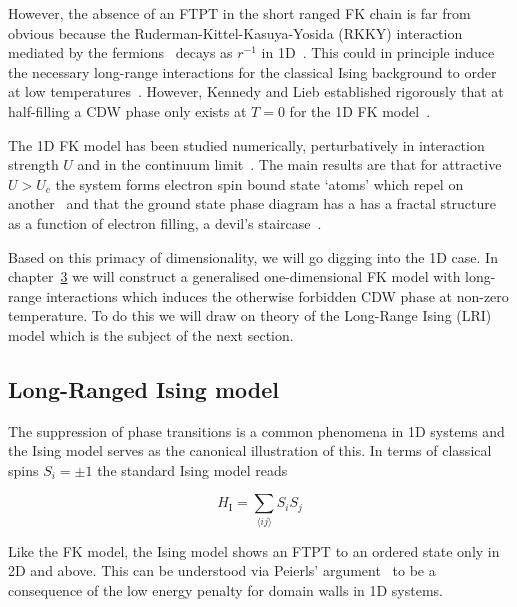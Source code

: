However, the absence of an FTPT in the short ranged FK chain is far from obvious because the Ruderman-Kittel-Kasuya-Yosida (RKKY) interaction mediated by the fermions~\autocite{kasuyaTheoryMetallicFerro1956,rudermanIndirectExchangeCoupling1954,vanvleckNoteInteractionsSpins1962,yosidaMagneticPropertiesCuMn1957} decays as \(r^{-1}\) in 1D~\autocite{rusinCalculationRKKYRange2017}. This could in principle induce the necessary long-range interactions for the classical Ising background to order at low temperatures~\autocite{thoulessLongRangeOrderOneDimensional1969,peierlsIsingModelFerromagnetism1936}. However, Kennedy and Lieb established rigorously that at half-filling a CDW phase only exists at \(T = 0\) for the 1D FK model~\autocite{kennedyItinerantElectronModel1986}.

The 1D FK model has been studied numerically, perturbatively in interaction strength \(U\) and in the continuum limit~\autocite{bursillOneDimensionalContinuum1994}. The main results are that for attractive \(U > U_c\) the system forms electron spin bound state `atoms' which repel on another~\autocite{gruberGroundStateEnergyLowTemperature1993} and that the ground state phase diagram has a has a fractal structure as a function of electron filling, a devil's staircase~\autocite{freericksTwostateOnedimensionalSpinless1990,michelettiCompleteDevilStaircase1997}.

Based on this primacy of dimensionality, we will go digging into the 1D case. In chapter~\protect\hyperlink{chap:3-the-long-range-falicov-kimball-model}{3} we will construct a generalised one-dimensional FK model with long-range interactions which induces the otherwise forbidden CDW phase at non-zero temperature. To do this we will draw on theory of the Long-Range Ising (LRI) model which is the subject of the next section.

\hypertarget{long-ranged-ising-model}{%
\subsection{Long-Ranged Ising model}\label{long-ranged-ising-model}}

The suppression of phase transitions is a common phenomena in 1D systems and the Ising model serves as the canonical illustration of this. In terms of classical spins \(S_i = \pm 1\) the standard Ising model reads

\[H_{\mathrm{I}} = \sum_{\langle ij \rangle} S_i S_j\]

Like the FK model, the Ising model shows an FTPT to an ordered state only in 2D and above. This can be understood via Peierls' argument~\autocite{peierlsIsingModelFerromagnetism1936,kennedyItinerantElectronModel1986} to be a consequence of the low energy penalty for domain walls in 1D systems.

